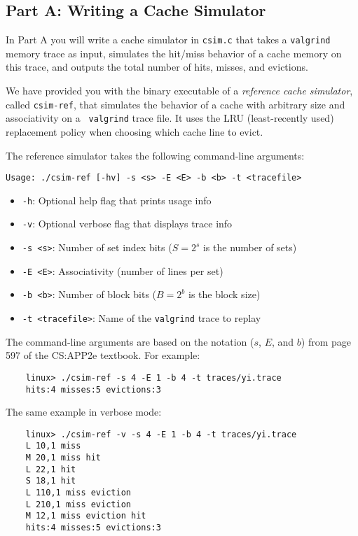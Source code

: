 \documentclass[11pt]{article}
\begin{document}
\subsection{Part A: Writing a Cache Simulator}

In Part A you will write a cache simulator in {\tt csim.c} that takes
a {\tt valgrind} memory trace as input, simulates the hit/miss
behavior of a cache memory on this trace, and outputs the total number
of hits, misses, and evictions.

We have provided you with the binary executable of a {\em reference
  cache simulator}, called \verb+csim-ref+, that simulates the
behavior of a cache with arbitrary size and associativity on a {\tt
  valgrind} trace file.  It uses the LRU (least-recently used)
replacement policy when choosing which cache line to evict.

The reference simulator takes the following command-line arguments:
\begin{verbatim}
Usage: ./csim-ref [-hv] -s <s> -E <E> -b <b> -t <tracefile>
\end{verbatim}
\begin{itemize}
\item    {\tt -h}: Optional help flag that prints usage info
\item    {\tt -v}: Optional verbose flag that displays trace info
\item     {\tt -s <s>}: Number of set index bits ($S = 2^s$ is the number of sets)
\item    {\tt -E <E>}: Associativity (number of lines per set)
\item     {\tt -b <b>}: Number of block bits ($B = 2^b$ is the block size)
\item     {\tt -t <tracefile>}: Name of the {\tt valgrind} trace to replay
\end{itemize}
The command-line arguments are based on the notation ($s$, $E$, and
$b$) from page 597 of the CS:APP2e textbook. For example:
\begin{verbatim}
    linux> ./csim-ref -s 4 -E 1 -b 4 -t traces/yi.trace
    hits:4 misses:5 evictions:3
\end{verbatim}
The same example in verbose mode:
\begin{verbatim}
    linux> ./csim-ref -v -s 4 -E 1 -b 4 -t traces/yi.trace
    L 10,1 miss
    M 20,1 miss hit
    L 22,1 hit
    S 18,1 hit
    L 110,1 miss eviction
    L 210,1 miss eviction
    M 12,1 miss eviction hit
    hits:4 misses:5 evictions:3
\end{verbatim}
\end{document}

